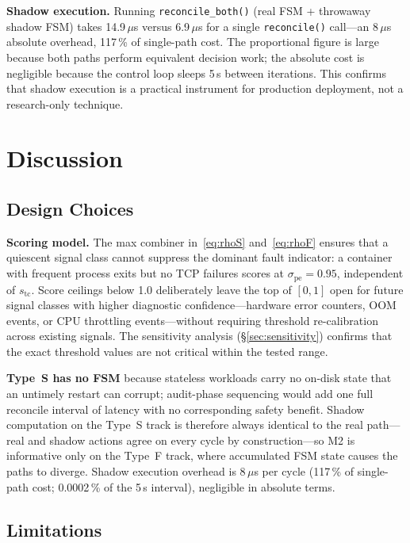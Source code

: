 \documentclass[conference]{IEEEtran}
\begin{document}
\textbf{Shadow execution.} Running \texttt{reconcile\_both()} (real FSM + throwaway shadow FSM) takes 14.9\,$\mu$s versus 6.9\,$\mu$s for a single \texttt{reconcile()} call---an 8\,$\mu$s absolute overhead, 117\,\% of single-path cost. The proportional figure is large because both paths perform equivalent decision work; the absolute cost is negligible because the control loop sleeps 5\,s between iterations. This confirms that shadow execution is a practical instrument for production deployment, not a research-only technique.

\section{Discussion}
\label{sec:discussion}

\subsection{Design Choices}

\textbf{Scoring model.} The max combiner in~\eqref{eq:rhoS} and~\eqref{eq:rhoF} ensures that a quiescent signal class cannot suppress the dominant fault indicator: a container with frequent process exits but no TCP failures scores at $\sigma_{\mathrm{pe}} = 0.95$, independent of $s_{\mathrm{tc}}$. Score ceilings below 1.0 deliberately leave the top of $[0, 1]$ open for future signal classes with higher diagnostic confidence---hardware error counters, OOM events, or CPU throttling events---without requiring threshold re-calibration across existing signals. The sensitivity analysis (§\ref{sec:sensitivity}) confirms that the exact threshold values are not critical within the tested range.

\textbf{Type~S has no FSM} because stateless workloads carry no on-disk state that an untimely restart can corrupt; audit-phase sequencing would add one full reconcile interval of latency with no corresponding safety benefit. Shadow computation on the Type~S track is therefore always identical to the real path---real and shadow actions agree on every cycle by construction---so M2 is informative only on the Type~F track, where accumulated FSM state causes the paths to diverge. Shadow execution overhead is 8\,$\mu$s per cycle (117\,\% of single-path cost; 0.0002\,\% of the 5\,s interval), negligible in absolute terms.

\subsection{Limitations}
\label{sec:limitations}
\end{document}
